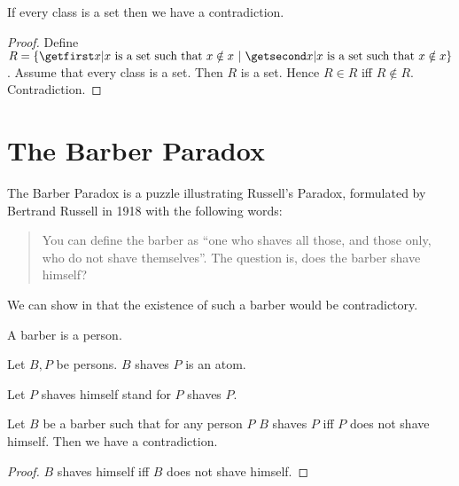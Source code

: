 \documentclass{article}
\begin{document}
  \begin{forthel}
    \begin{theorem}
      If every class is a set then we have a contradiction.
    \end{theorem}
    \begin{proof}
      Define $R = \class{x | \text{$x$ is a set such that $x \notin x$}}$.
      Assume that every class is a set.
      Then $R$ is a set.
      Hence $R \in R$ iff $R \notin R$.
      Contradiction.
    \end{proof}
  \end{forthel}


  \section*{The Barber Paradox}

  The Barber Paradox is a puzzle illustrating Russell's Paradox, formulated by
  Bertrand Russell in 1918 with the following words:

  \begin{quotation}
    \noindent You can define the barber as \enquote{one who shaves all those,
    and those only, who do not shave themselves}.
    The question is, does the barber shave himself?
  \end{quotation}

  \noindent We can show in \Naproche that the existence of such a barber would
  be contradictory.

  \begin{forthel}
    \begin{signature}
      A barber is a person.
    \end{signature}

    \begin{signature}
      Let $B, P$ be persons.
      $B$ shaves $P$ is an atom.
    \end{signature}

    Let $P$ shaves himself stand for $P$ shaves $P$.

    \begin{theorem}
      Let $B$ be a barber such that for any person $P$ $B$ shaves $P$ iff $P$
      does not shave himself.
      Then we have a contradiction.
    \end{theorem}
    \begin{proof}
      $B$ shaves himself iff $B$ does not shave himself.
    \end{proof}
  \end{forthel}
\end{document}
